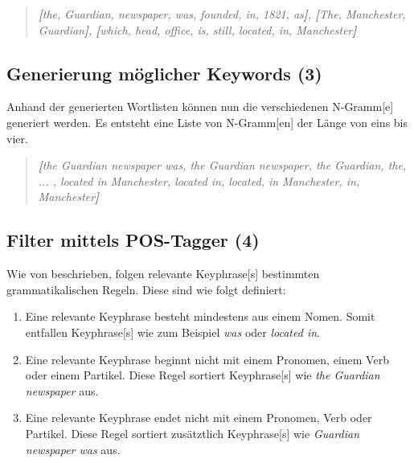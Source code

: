 \begin{quote}
\textit{\textbf{[}the, Guardian, newspaper, was, founded, in, 1821, as\textbf{]}, \textbf{[}The, Manchester, Guardian\textbf{]}, \textbf{[}which, head, office, is, still, located, in, Manchester\textbf{]}}
\end{quote}



\subsection{Generierung möglicher Keywords (3)}


Anhand der generierten Wortlisten können nun die verschiedenen \gls{N-Gramm}[e] generiert werden. Es entsteht eine Liste von \gls{N-Gramm}[en] der Länge von eins bis vier.

\begin{quote}
\textit{\textbf{[}the Guardian newspaper was, the Guardian newspaper, the Gu\-ardian, the, ... , located in Manchester, located in, located, in Manchester, in, Manchester\textbf{]}}
\end{quote}



\subsection{Filter mittels POS-Tagger (4)}


Wie von \cite{parameswaran2010towards} beschrieben, folgen relevante \gls{Keyphrase}[s] bestimmten grammatikalischen Regeln. Diese sind wie folgt definiert:
\begin{enumerate}
    \item Eine relevante \gls{Keyphrase} besteht mindestens aus einem Nomen. Somit entfallen \gls{Keyphrase}[s] wie zum Beispiel \textit{was} oder \textit{located in}.
    \item Eine relevante \gls{Keyphrase} beginnt nicht mit einem Pronomen, einem Verb oder einem Partikel. Diese Regel sortiert \gls{Keyphrase}[s] wie \textit{the Guardian newspaper} aus.
    \item Eine relevante \gls{Keyphrase} endet nicht mit einem Pronomen, Verb oder Partikel. Diese Regel sortiert zusätztlich \gls{Keyphrase}[s] wie \textit{Guardian newspaper was} aus.
\end{enumerate}

